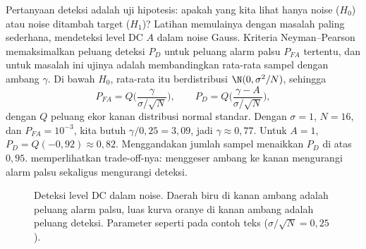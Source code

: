 Pertanyaan deteksi adalah uji hipotesis: apakah yang kita lihat hanya noise ($H_0$) atau noise ditambah
target ($H_1$)? Latihan memulainya dengan masalah paling sederhana, mendeteksi level DC $A$ dalam noise Gauss.
Kriteria Neyman--Pearson memaksimalkan peluang deteksi $P_D$ untuk peluang alarm palsu $P_{FA}$ tertentu,
dan untuk masalah ini ujinya adalah membandingkan rata-rata sampel dengan ambang $\gamma$. Di bawah $H_0$,
rata-rata itu berdistribusi $\N(0,\sigma^2/N)$, sehingga
\begin{equation}
P_{FA}=Q\Big(\frac{\gamma}{\sigma/\sqrt N}\Big),\qquad P_D=Q\Big(\frac{\gamma-A}{\sigma/\sqrt N}\Big),
\end{equation}
dengan $Q$ peluang ekor kanan distribusi normal standar. Dengan $\sigma=1$, $N=16$, dan $P_{FA}=10^{-3}$, kita
butuh $\gamma/0{,}25=3{,}09$, jadi $\gamma\approx0{,}77$. Untuk $A=1$, $P_D=Q(-0{,}92)\approx0{,}82$.
Menggandakan jumlah sampel menaikkan $P_D$ di atas $0{,}95$.  memperlihatkan
trade-off-nya: menggeser ambang ke kanan mengurangi alarm palsu sekaligus mengurangi deteksi.

\begin{figure}[ht]
\centering
{}
\caption{Deteksi level DC dalam noise. Daerah biru di kanan ambang adalah peluang alarm palsu, luas kurva
oranye di kanan ambang adalah peluang deteksi. Parameter seperti pada contoh teks ($\sigma/\sqrt N=0{,}25$).}
\label{fig:deteksi}
\end{figure}

